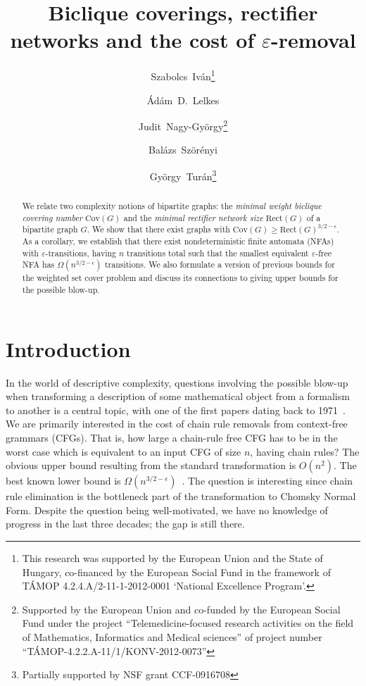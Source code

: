 \documentclass[submission]{llncs}
\title{Biclique coverings, rectifier networks and the cost of $\varepsilon$-removal}
\author{
Szabolcs~Iv\'an\inst{1}\thanks{This research was supported by the European Union and the State of Hungary, co-financed by the European Social Fund in the framework of T\'AMOP 4.2.4.A/2-11-1-2012-0001 ‘National Excellence Program’.}
\and \'Ad\'am~D.~Lelkes\inst{2}
\and Judit~Nagy-Gy\"orgy\inst{1}\thanks{Supported by the European Union and co-funded by the European Social Fund under the project ``Telemedicine-focused research activities on the field of Mathematics, Informatics and Medical sciences'' of project number ``T\'AMOP-4.2.2.A-11/1/KONV-2012-0073''}
\and Bal\'azs~Sz\"or\'enyi\inst{3,4}
\and Gy\"orgy~Tur\'an\inst{2,3}\thanks{Partially supported by NSF grant CCF-0916708}
}
\institute{
	University of Szeged, Hungary
	\and	
	University of Illinois at Chicago
	\and
	MTA-SZTE Research Group on Artificial Intelligence
	\and
	INRIA Lille, SequeL project, France
}
\def\Cov{{\mathrm{Cov}}}
\def\Rect{{\mathrm{Rect}}}
\begin{document}
\maketitle

\begin{abstract}
We relate two complexity notions of bipartite graphs: the \emph{minimal weight biclique covering number} $\Cov(G)$ and
the \emph{minimal rectifier network size} $\Rect(G)$ of a bipartite graph $G$.
We show that there exist graphs with $\Cov(G)\geq \Rect(G)^{3/2-\epsilon}$.
As a corollary, we establish that there exist nondeterministic finite automata (NFAs) with $\varepsilon$-transitions,
having $n$ transitions total such that the smallest equivalent $\varepsilon$-free NFA has $\Omega(n^{3/2-\epsilon})$ transitions.
We also formulate a version of previous bounds for the weighted set cover problem and discuss its connections
to giving upper bounds for the possible blow-up.
\end{abstract}

\section{Introduction}
\label{sec-intro}
  In the world of descriptive complexity, questions involving the possible blow-up when transforming a description of some mathematical
  object from a formalism to another is a central topic, with one of the first papers dating back to 1971~\cite{conf/focs/MeyerF71}.
  We are primarily interested in the cost of chain rule removals from context-free grammars (CFGs).
  That is, how large a chain-rule free CFG has to be in the worst case which is equivalent to an input CFG of size $n$, having chain rules?
  The obvious upper bound resulting from the standard transformation is $O(n^2)$.
  The best known lower bound is $\Omega(n^{3/2-\epsilon})$~\cite{Blum1983287}.
  The question is interesting since chain rule elimination is the bottleneck part of the transformation to Chomsky Normal Form.
  Despite the question being well-motivated, we have no knowledge of progress in the last three decades; the gap is still there.
\end{document}
